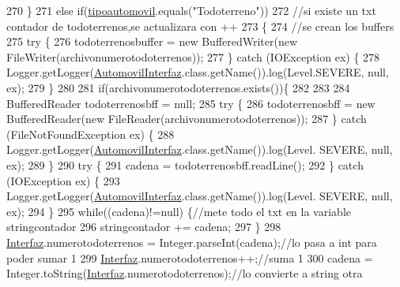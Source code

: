 \begin{DoxyCode}
270         \}
271         \textcolor{keywordflow}{else} \textcolor{keywordflow}{if}(\mbox{\hyperlink{classejercicio2_1_1_automovil_interfaz_ae53ea3336ded07ff47311d4e6d56cdb7}{tipoautomovil}}.equals(\textcolor{stringliteral}{"Todoterreno"}))
272         \textcolor{comment}{//si existe un txt contador de todoterrenos,se actualizara con ++}
273         \{
274             \textcolor{comment}{//se crean los buffers}
275                 \textcolor{keywordflow}{try} \{
276                     todoterrenosbuffer = \textcolor{keyword}{new} BufferedWriter(\textcolor{keyword}{new} FileWriter(archivonumerotodoterrenos));
277                 \} \textcolor{keywordflow}{catch} (IOException ex) \{
278                     Logger.getLogger(\mbox{\hyperlink{classejercicio2_1_1_automovil_interfaz_a0ebeee030ec43693c371da3b68222644}{AutomovilInterfaz}}.class.getName()).log(Level.SEVERE, 
      null, ex);
279                 \}
280             
281             \textcolor{keywordflow}{if}(archivonumerotodoterrenos.exists())\{
282             
283                 
284                 BufferedReader todoterrenosbff = null;
285                     \textcolor{keywordflow}{try} \{
286                         todoterrenosbff = \textcolor{keyword}{new} BufferedReader(\textcolor{keyword}{new} FileReader(archivonumerotodoterrenos));
287                     \} \textcolor{keywordflow}{catch} (FileNotFoundException ex) \{
288                         Logger.getLogger(\mbox{\hyperlink{classejercicio2_1_1_automovil_interfaz_a0ebeee030ec43693c371da3b68222644}{AutomovilInterfaz}}.class.getName()).log(Level.
      SEVERE, null, ex);
289                     \}
290                     \textcolor{keywordflow}{try} \{
291                         cadena = todoterrenosbff.readLine();
292                     \} \textcolor{keywordflow}{catch} (IOException ex) \{
293                         Logger.getLogger(\mbox{\hyperlink{classejercicio2_1_1_automovil_interfaz_a0ebeee030ec43693c371da3b68222644}{AutomovilInterfaz}}.class.getName()).log(Level.
      SEVERE, null, ex);
294                     \}
295                 \textcolor{keywordflow}{while}((cadena)!=null) \{\textcolor{comment}{//mete todo el txt en la variable stringcontador}
296                         stringcontador += cadena;
297                     \}
298                 \mbox{\hyperlink{namespace_interfaz}{Interfaz}}.numerotodoterrenos = Integer.parseInt(cadena);\textcolor{comment}{//lo pasa a int para poder
       sumar 1}
299                 \mbox{\hyperlink{namespace_interfaz}{Interfaz}}.numerotodoterrenos++;\textcolor{comment}{//suma 1}
300                 cadena = Integer.toString(\mbox{\hyperlink{namespace_interfaz}{Interfaz}}.numerotodoterrenos);\textcolor{comment}{//lo convierte a string otra
}
\end{DoxyCode}
